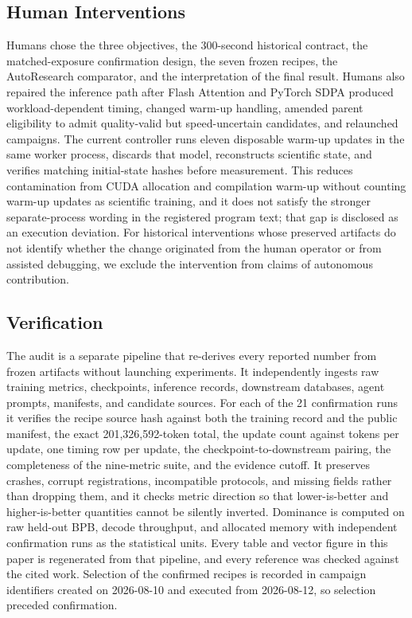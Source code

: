 \documentclass{article}
\begin{document}
\subsection{Human Interventions}
Humans chose the three objectives, the 300-second historical contract, the matched-exposure confirmation design, the seven frozen recipes, the AutoResearch comparator, and the interpretation of the final result. Humans also repaired the inference path after Flash Attention and PyTorch SDPA produced workload-dependent timing, changed warm-up handling, amended parent eligibility to admit quality-valid but speed-uncertain candidates, and relaunched campaigns. The current controller runs eleven disposable warm-up updates in the same worker process, discards that model, reconstructs scientific state, and verifies matching initial-state hashes before measurement. This reduces contamination from CUDA allocation and compilation warm-up without counting warm-up updates as scientific training, and it does not satisfy the stronger separate-process wording in the registered program text; that gap is disclosed as an execution deviation. For historical interventions whose preserved artifacts do not identify whether the change originated from the human operator or from assisted debugging, we exclude the intervention from claims of autonomous contribution.

\subsection{Verification}
The audit is a separate pipeline that re-derives every reported number from frozen artifacts without launching experiments. It independently ingests raw training metrics, checkpoints, inference records, downstream databases, agent prompts, manifests, and candidate sources. For each of the 21 confirmation runs it verifies the recipe source hash against both the training record and the public manifest, the exact 201,326,592-token total, the update count against tokens per update, one timing row per update, the checkpoint-to-downstream pairing, the completeness of the nine-metric suite, and the evidence cutoff. It preserves crashes, corrupt registrations, incompatible protocols, and missing fields rather than dropping them, and it checks metric direction so that lower-is-better and higher-is-better quantities cannot be silently inverted. Dominance is computed on raw held-out BPB, decode throughput, and allocated memory with independent confirmation runs as the statistical units. Every table and vector figure in this paper is regenerated from that pipeline, and every reference was checked against the cited work. Selection of the confirmed recipes is recorded in campaign identifiers created on 2026-08-10 and executed from 2026-08-12, so selection preceded confirmation.
\end{document}

